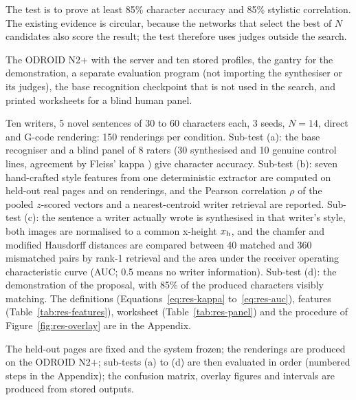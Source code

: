 
            The test is to prove at least 85\% character accuracy and 85\% stylistic correlation.
            The existing evidence is circular, because the networks that select the best of $N$ candidates also score the result; the test therefore uses judges outside the search.


            The ODROID N2+ with the server and ten stored profiles, the gantry for the demonstration, a separate evaluation program (not importing the synthesiser or its judges), the base recognition checkpoint that is not used in the search, and printed worksheets for a blind human panel.


            Ten writers, 5 novel sentences of 30 to 60 characters each, 3 seeds, $N=14$, direct and G-code rendering: 150 renderings per condition.
            Sub-test (a): the base recogniser and a blind panel of 8 raters (30 synthesised and 10 genuine control lines, agreement by Fleiss' kappa \cite{fleiss1971}) give character accuracy.
            Sub-test (b): seven hand-crafted style features from one deterministic extractor are computed on held-out real pages and on renderings, and the Pearson correlation $\rho$ of the pooled $z$-scored vectors and a nearest-centroid writer retrieval are reported.
            Sub-test (c): the sentence a writer actually wrote is synthesised in that writer's style, both images are normalised to a common x-height $x_{\mathrm{h}}$, and the chamfer and modified Hausdorff distances \cite{dubuisson1994} are compared between 40 matched and 360 mismatched pairs by rank-1 retrieval and the area under the receiver operating characteristic curve (AUC; 0.5 means no writer information).
            Sub-test (d): the demonstration of the proposal, with 85\% of the produced characters visibly matching.
            The definitions (Equations~\ref{eq:res-kappa} to~\ref{eq:res-auc}), features (Table~\ref{tab:res-features}), worksheet (Table~\ref{tab:res-panel}) and the procedure of Figure~\ref{fig:res-overlay} are in the Appendix.


            The held-out pages are fixed and the system frozen; the renderings are produced on the ODROID N2+; sub-tests (a) to (d) are then evaluated in order (numbered steps in the Appendix); the confusion matrix, overlay figures and intervals are produced from stored outputs.

